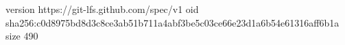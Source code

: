 version https://git-lfs.github.com/spec/v1
oid sha256:c0d8975bd8d3c8ce3ab51b711a4abf3be5c03ce66e23d1a6b54e61316aff6b1a
size 490
